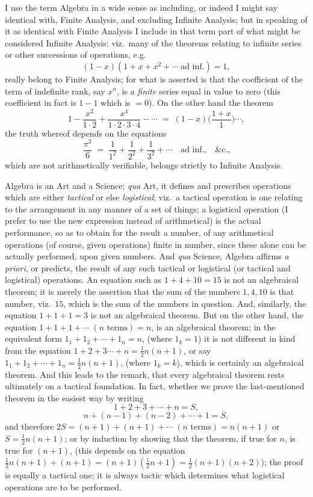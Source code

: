 \documentclass[11pt,a4paper]{article}
\begin{document}
I use the term Algebra in a wide sense as including, or indeed I might say identical with, Finite Analysis, and excluding Infinite Analysis; but in speaking of it as identical with Finite Analysis I include in that term part of what might be considered Infinite Analysis; viz.\ many of the theorems relating to infinite series or other successions of operations, e.g.
\[
(1 - x)(1 + x + x^2 + \dotsb\;\text{ad inf.}) = 1,
\]
really belong to Finite Analysis; for what is asserted is that the coefficient of the term of indefinite rank, say $x^n$, is a \emph{finite} series equal in value to zero (this coefficient in fact is $1 - 1$ which is $= 0$). On the other hand the theorem
\[
1 - \frac{x^2}{1\cdot 2} + \frac{x^4}{1\cdot 2\cdot 3\cdot 4} - \dotsb \;=\; (1 - x)\biggl(\frac{1 + x}{1}\biggr)\dotsb,
\]
the truth whereof depends on the equations
\[
\frac{\pi^2}{6} \;=\; \frac{1}{1^2} + \frac{1}{2^2} + \frac{1}{3^2} + \dotsb\quad\text{ad inf.,}\quad\text{\&c.,}
\]
which are not arithmetically verifiable, belongs strictly to Infinite Analysis.

\medskip

Algebra is an Art and a Science; \emph{qua} Art, it defines and prescribes operations which are either \emph{tactical} or else \emph{logistical}; viz.\ a tactical operation is one relating to the arrangement in any manner of a set of things; a logistical operation (I prefer to use the new expression instead of arithmetical) is the actual performance, so as to obtain for the result a number, of any arithmetical operations (of course, given operations) finite in number, since these alone can be actually performed, upon given numbers. And \emph{qua} Science, Algebra affirms \emph{a priori}, or predicts, the result of any such tactical or logistical (or tactical and logistical) operations. An equation such as $1 + 4 + 10 = 15$ is not an algebraical theorem; it is merely the assertion that the sum of the numbers $1, 4, 10$ is that number, viz.\ $15$, which is the sum of the numbers in question. And, similarly, the equation $1 + 1 + 1 = 3$ is not an algebraical theorem. But on the other hand, the equation $1 + 1 + 1 + \dotsb\;(n\text{ terms}) = n$, is an algebraical theorem; in the equivalent form $1_1 + 1_2 + \dotsb + 1_n = n$, (where $1_k = 1$) it is not different in kind from the equation $1 + 2 + 3 \dotsb + n = \tfrac{1}{2}n(n+1)$, or say $1_1 + 1_2 + \dotsb + 1_n = \tfrac{1}{2}n(n+1)$, (where $1_k = k$), which is certainly an algebraical theorem. And this leads to the remark, that every algebraical theorem rests ultimately on a tactical foundation. In fact, whether we prove the last-mentioned theorem in the easiest way by writing
\[
1 + 2 + 3 + \dotsb + n = S,
\]
\[
n + (n-1) + (n-2) + \dotsb + 1 = S,
\]
and therefore $2S = (n+1) + (n+1) + \dotsb\;(n\text{ terms}) = n(n+1)$ or $S = \tfrac{1}{2}n(n+1)$; or by induction by showing that the theorem, if true for $n$, is true for $(n+1)$, (this depends on the equation $\tfrac{1}{2}n(n+1) + (n+1) = (n+1)(\tfrac{1}{2}n + 1) = \tfrac{1}{2}(n+1)(n+2)$); the proof is equally a tactical one; it is always tactic which determines what logistical operations are to be performed.
\end{document}
